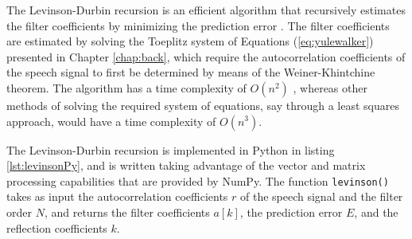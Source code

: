 The Levinson-Durbin recursion is an efficient algorithm that recursively estimates the filter coefficients by minimizing the prediction error \cite{yuMultistageLevinsonDurbinAlgorithm2002}. The filter coefficients are estimated by solving the Toeplitz system of Equations (\ref{eq:yulewalker}) presented in Chapter \ref{chap:back}, which require the autocorrelation coefficients of the speech signal to first be determined by means of the Weiner-Khintchine theorem. The algorithm has a time complexity of $O(n^2)$ \cite{hayes1996statistical}, whereas other methods of solving the required system of equations, say through a least squares approach, would have a time complexity of $O(n^3)$. 

The Levinson-Durbin recursion is implemented in Python in listing \ref{lst:levinsonPy}, and is written taking advantage of the vector and matrix processing capabilities that are provided by NumPy. The function \texttt{levinson()} takes as input the autocorrelation coefficients $r$ of the speech signal and the filter order $N$, and returns the filter coefficients $a[k]$, the prediction error $E$, and the reflection coefficients $k$.

